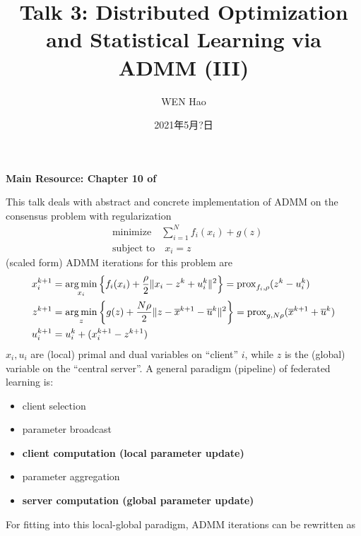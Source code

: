 



\title{Talk 3: Distributed Optimization and Statistical Learning via ADMM (III)}
\date{2021年5月?日}
\author{WEN Hao}

\maketitle

{\bfseries Main Resource: Chapter 10 of \cite{boyd2011distributed}}

This talk deals with abstract and concrete implementation of ADMM on the consensus problem with regularization
\begin{align*}
    & \text{minimize} \quad \sum\limits_{i=1}^N f_i(x_i) + g(z) \\
    & \text{subject to} \quad x_i = z
\end{align*}
(scaled form) ADMM iterations for this problem are
\begin{align*}
    x_i^{k+1} & = \operatorname*{arg\,min}_{x_i} \left\{ f_i(x_i) + \dfrac{\rho}{2} \lVert x_i - z^k + u_i^k \rVert^2 \right\} = \operatorname{prox}_{f_i,\rho}(z^k - u_i^k) \\
    z^{k+1} & = \operatorname*{arg\,min}_z \left\{ g(z) + \dfrac{N\rho}{2} \lVert z - \overline{x}^{k+1} - \overline{u}^k \rVert^2 \right\} = \operatorname{prox}_{g,N\rho}(\overline{x}^{k+1} + \overline{u}^k) \\
    u_i^{k+1} & = u_i^k + (x_i^{k+1} - z^{k+1})
\end{align*}
$x_i, u_i$ are (local) primal and dual variables on ``client'' $i$, while $z$ is the (global) variable on the ``central server''. A general paradigm (pipeline) of federated learning is:
\begin{itemize}
    \item client selection
    \item parameter broadcast
    \item {\bfseries client computation (local parameter update)}
    \item parameter aggregation
    \item {\bfseries server computation (global parameter update)}
\end{itemize}
For fitting into this local-global paradigm, ADMM iterations can be rewritten as
